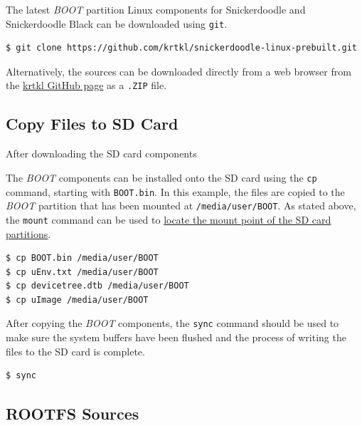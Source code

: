 The latest \textit{BOOT} partition Linux components for Snickerdoodle and Snickerdoodle Black can be downloaded using \texttt{git}.


\begin{fullwidth}
\begin{lstlisting}[style=text]
$ git clone https://github.com/krtkl/snickerdoodle-linux-prebuilt.git
\end{lstlisting}
\end{fullwidth}


Alternatively, the sources can be downloaded directly from a web browser from the \href{https://github.com/krtkl/snickerdoodle-linux-prebuilt}{krtkl GitHub page} as a \texttt{.ZIP} file.



\subsection{Copy Files to SD Card}
After downloading the SD card components


The \textit{BOOT} components can be installed onto the SD card using the \texttt{cp} command, starting with \texttt{BOOT.bin}. In this example, the files are copied to the \textit{BOOT} partition that has been mounted at \texttt{/media/user/BOOT}. As stated above, the \texttt{mount} command can be used to \hyperref[sub:locatesd]{locate the mount point of the SD card partitions}.


\begin{lstlisting}
$ cp BOOT.bin /media/user/BOOT
$ cp uEnv.txt /media/user/BOOT
$ cp devicetree.dtb /media/user/BOOT
$ cp uImage /media/user/BOOT
\end{lstlisting}


After copying the \textit{BOOT} components, the \texttt{sync} command should be used to make sure the system buffers have been flushed and the process of writing the files to the SD card is complete.


\begin{lstlisting}
$ sync
\end{lstlisting}


\subsection{ROOTFS Sources}

